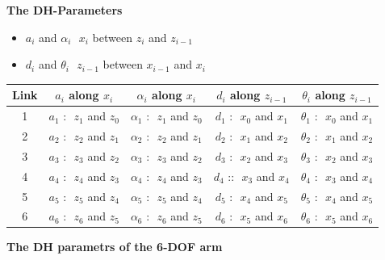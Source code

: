 \documentclass[fleqn,english,11pt,a4paper,landscape]{article}
\begin{document}
	\textbf{The DH-Parameters}
	\begin{itemize}
		\item $a_i$ and $\alpha_i$ \textrightarrow $\,\, x_i$ between $z_i$ and $z_{i-1}$
		
		\item $d_i$ and $\theta_i$ \textrightarrow $\,\, z_{i-1}$ between $x_{i-1}$ and $x_{i}$
	\end{itemize}
	
	\vspace{10pt}
	\begin{tabular}{|c|c|c|c|c|}
		\hline
		Link & $a_i$ \textrightarrow along $x_i$ & $\alpha_i$ \textrightarrow along $x_i$ & $d_i$ \textrightarrow along $z_{i-1}$ & $\theta_i$ \textrightarrow along $z_{i-1}$ \\
		\hline
		1 & $a_1$ : \textrightarrow $\,\, z_1$ and $z_0$  & $\alpha_1$ : \textrightarrow $\,\, z_1$ and $z_0$ & $d_1$ : \textrightarrow $\,\, x_0$ and $x_1$ & $\theta_1$ : \textrightarrow $\,\, x_0$ and $x_1$  \\
		\hline
		2 & $a_2$ : \textrightarrow $\,\, z_2$ and $z_1$  & $\alpha_2$ : \textrightarrow $\,\, z_2$ and $z_1$ & $d_2$ : \textrightarrow $\,\, x_1$ and $x_2$ & $\theta_2$ : \textrightarrow $\,\, x_1$ and $x_2$ \\
		\hline
		3 & $a_3$ : \textrightarrow $\,\, z_3$ and $z_2$ & $\alpha_3$ : \textrightarrow $\,\, z_3$ and $z_2$ & $d_3$ : \textrightarrow $\,\, x_2$ and $x_3$ & $\theta_3$ : \textrightarrow $\,\, x_2$ and $x_3$ \\
		\hline
		4 & $a_4$ : \textrightarrow $\,\, z_4$ and $z_3$  & $\alpha_4$ : \textrightarrow $\,\, z_4$ and $z_3$ & $d_4$ :: \textrightarrow $\,\, x_3$ and $x_4$ & $\theta_4$ : \textrightarrow $\,\, x_3$ and $x_4$ \\
		\hline
		5 & $a_5$ : \textrightarrow $\,\, z_5$ and $z_4$ & $\alpha_5$ : \textrightarrow $\,\, z_5$ and $z_4$ & $d_5$ : \textrightarrow $\,\, x_4$ and $x_5$ & $\theta_5$ : \textrightarrow $\,\, x_4$ and $x_5$ \\
		\hline
		6 & $a_6$ : \textrightarrow $\,\, z_6$ and $z_5$ & $\alpha_6$ : \textrightarrow $\,\, z_6$ and $z_5$ & $d_6$ : \textrightarrow $\,\, x_5$ and $x_6$ & $\theta_6$ : \textrightarrow $\,\, x_5$ and $x_6$ \\
		\hline
	\end{tabular}
	
	\vspace{10pt}
	\textbf{The DH parametrs of the 6-DOF arm} \\
	
\end{document}
